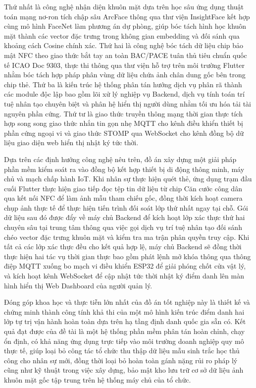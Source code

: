 \documentclass[../DoAn.tex]{subfiles}
\begin{document}
Thứ nhất là công nghệ nhận diện khuôn mặt dựa trên học sâu ứng dụng thuật toán mạng nơ-ron tích chập sâu ArcFace thông qua thư viện InsightFace kết hợp cùng mô hình FaceNet làm phương án dự phòng, giúp bóc tách hình học khuôn mặt thành các vector đặc trưng trong không gian embedding và đối sánh qua khoảng cách Cosine chính xác. Thứ hai là công nghệ bóc tách dữ liệu chip bảo mật NFC theo giao thức bắt tay an toàn BAC/PACE tuân thủ tiêu chuẩn quốc tế ICAO Doc 9303, thực thi thông qua thư viện hỗ trợ trên môi trường Flutter nhằm bóc tách hợp pháp phân vùng dữ liệu chứa ảnh chân dung gốc bên trong chip thẻ. Thứ ba là kiến trúc hệ thống phân tán hướng dịch vụ phân rã thành các module độc lập bao gồm lõi xử lý nghiệp vụ Backend, dịch vụ tính toán trí tuệ nhân tạo chuyên biệt và phân hệ hiển thị người dùng nhằm tối ưu hóa tải tài nguyên phần cứng. Thứ tư là giao thức truyền thông mạng thời gian thực tích hợp song song giao thức nhắn tin gọn nhẹ MQTT cho kênh điều khiển thiết bị phần cứng ngoại vi và giao thức STOMP qua WebSocket cho kênh đồng bộ dữ liệu giao diện web hiển thị nhật ký tức thời.

Dựa trên các định hướng công nghệ nêu trên, đồ án xây dựng một giải pháp phần mềm kiểm soát ra vào đồng bộ kết hợp thiết bị di động thông minh, máy chủ và mạch chấp hành IoT. Khi nhân sự thực hiện quét thẻ, ứng dụng trạm đầu cuối Flutter thực hiện giao tiếp đọc tệp tin dữ liệu từ chip Căn cước công dân qua kết nối NFC để làm ảnh mẫu tham chiếu gốc, đồng thời kích hoạt camera chụp ảnh thực tế để thực hiện tiến trình đối soát lớp thứ nhất ngay tại chỗ. Gói dữ liệu sau đó được đẩy về máy chủ Backend để kích hoạt lớp xác thực thứ hai chuyên sâu tại trung tâm thông qua việc gọi dịch vụ trí tuệ nhân tạo đối sánh chéo vector đặc trưng khuôn mặt và kiểm tra ma trận phân quyền truy cập. Khi tất cả các lớp xác thực đều cho kết quả hợp lệ, máy chủ Backend sẽ đồng thời thực hiện hai tác vụ thời gian thực bao gồm phát lệnh mở khóa thông qua thông điệp MQTT xuống bo mạch vi điều khiển ESP32 để giải phóng chốt cửa vật lý, và kích hoạt kênh WebSocket để cập nhật tức thời nhật ký điểm danh lên màn hình hiển thị Web Dashboard của người quản lý.

Đóng góp khoa học và thực tiễn lớn nhất của đồ án tốt nghiệp này là thiết kế và chứng minh thành công tính khả thi của một mô hình kiến trúc điểm danh hai lớp tự trị vận hành hoàn toàn dựa trên hạ tầng định danh quốc gia sẵn có. Kết quả đạt được của đề tài là một hệ thống phần mềm phân tán hoàn chỉnh, chạy ổn định, có khả năng ứng dụng trực tiếp vào môi trường doanh nghiệp quy mô thực tế, giúp loại bỏ công tác tổ chức thu thập dữ liệu mẫu sinh trắc học thủ công cho nhân sự mới, đồng thời loại bỏ hoàn toàn gánh nặng rủi ro pháp lý cũng như kỹ thuật trong việc xây dựng, bảo mật kho lưu trữ cơ sở dữ liệu ảnh khuôn mặt gốc tập trung trên hệ thống máy chủ của tổ chức.
\end{document}
